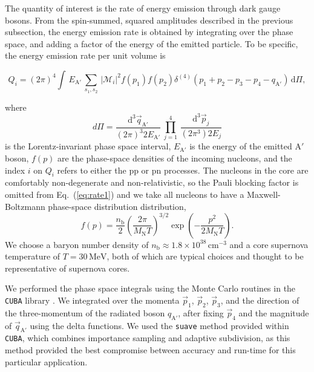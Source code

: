 \documentclass[nofootinbib,prd,superscriptaddress,twocolumn]{revtex4}
\newcommand{\beq}{\begin{equation}}
\newcommand{\eeq}{\end{equation}}
\newcommand{\qa}{q_{\mathrm{A}'}}
\newcommand{\Aprime}{\mathrm{A}'}
\newcommand{\dd}{\mathrm{d}}
\begin{document}
The quantity of interest is the rate of energy emission through dark gauge bosons. 
From the spin-summed, squared amplitudes described in the previous subsection, 
the energy emission rate is obtained by integrating over the phase space, 
and adding a factor of the energy of the emitted particle. To be specific, the 
energy emission rate per unit volume is 
%
\begin{widetext}
\beq
\label{eq:rate1}
Q_i = (2\pi)^4 \int\, E_{\mathrm{A}'} \, \sum_{s_1,s_2}\, \vert \mathcal{M}_i \vert^2 f(p_1) f(p_2)\delta^{(4)}(p_1+p_2-p_3-p_4-\qa)\, \dd \Pi,
\eeq
\end{widetext}
%
where 
%
\begin{equation}
d\Pi = \frac{\dd^3 \vec{q}_{\mathrm{A}'}}{(2\pi)^3 2E_{\mathrm{A}'}}\, \prod_{j=1}^{4}\, \frac{\dd^3 \vec{p}_j}{(2\pi^3) 2E_j}
\end{equation} 
is the Lorentz-invariant phase space interval, 
$ E_{\mathrm{A}'}$ is the energy of the emitted $\Aprime$ boson, 
$f(p)$ are the phase-space densities of the incoming nucleons, and 
the index $i$ on $Q_i$ refers to either the pp or pn processes. 
The nucleons in the core are comfortably non-degenerate and non-relativistic, 
so the Pauli blocking factor is omitted from Eq.~(\ref{eq:rate1}) and we take 
all nucleons to have a Maxwell-Boltzmann phase-space distribution distribution, 
\beq
f(p) =  \frac{n_{\mathrm{b}}}{2} \left( \frac{2 \pi}{M_{\mathrm{N}} T} \right)^{3/2} \exp \left(-\frac{p^2}{2 M_{\mathrm{N}} T} \right).
\eeq
%
We choose a baryon number density of $n_{\mathrm{b}} \approx 1.8 \times 10^{38}\, \mathrm{cm}^{-3}$ and a 
core supernova temperature of $T = 30\, \mathrm{MeV}$, both of which are typical choices and thought to 
be representative of supernova cores.


We performed the phase space integrals using the Monte Carlo routines in the {\tt CUBA} library \cite{Hahn:2004fe}.
We integrated over the momenta $\vec{p}_1$, $\vec{p}_2$, $\vec{p}_3$, and the direction of the 
three-momentum of the radiated boson $\hat{q}_{\mathrm{A}'}$, after fixing $\vec{p}_4$ 
and the magnitude of $\vec{q}_{\mathrm{A}'}$ using the delta functions.
 We used the {\tt suave} method provided within {\tt CUBA}, which combines 
importance sampling and adaptive subdivision, as this method provided the best compromise 
between accuracy and run-time for this particular application.
\end{document}

